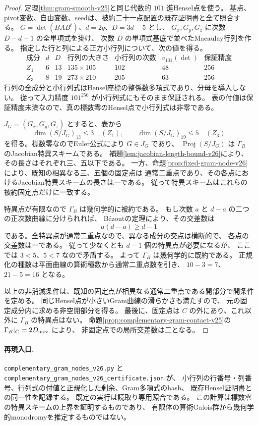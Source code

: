 \begin{proof}
定理\ref{thm:gram-smooth-v25}と同じ代数的 $101$ 進Hensel点を使う。
基点、pivot変数、自由変数、seedは、被約二十一点配置の既存証明書と全て照合する。
$G=\det(BAB^t)$、$d=2q$、$D=3d-5$ とし、
$G_x,G_y,G_z$ に次数 $D-d+1$ の全単項式を掛け、
次数 $D$ の単項式基底で並べたMacaulay行列を作る。
指定した行と列による正方小行列について、次の値を得る。
\[
\begin{array}{c|c|c|c|c|c|c}
 \text{成分}&d&D&\text{行列の大きさ}&
 \text{小行列の次数}&v_{101}(\det)&\text{保証精度}\\\hline
 Z_1&6&13&135\times105&102&48&256\\
 Z_3&8&19&273\times210&205&63&256
\end{array}
\]
行列の全成分と小行列式はHensel座標の整係数多項式であり、分母を導入しない。
従って入力精度 $101^{256}$ が小行列式にもそのまま保証される。
表の付値は保証精度未満なので、真の標数零のHensel点で小行列式は非零である。

$J_G=(G_x,G_y,G_z)$ とすると、表から
\[
 \dim(S/J_G)_{13}\leq3\quad(Z_1),\qquad
 \dim(S/J_G)_{19}\leq5\quad(Z_3)
\]
を得る。標数零なのでEuler公式により $G\in J_G$ であり、
$\operatorname{Proj}(S/J_G)$ は $\Gamma_B$ のJacobian特異スキームである。
補題\ref{lem:jacobian-length-bound-v26}により、その長さはそれぞれ三、五以下である。
一方、命題\ref{prop:fixed-gram-node-v26}により、既知の相異なる三、五個の固定点は
通常二重点であり、その各点におけるJacobian特異スキームの長さは一である。
従って特異スキームはこれらの被約固定点だけに一致する。

特異点が有限なので $\Gamma_B$ は幾何学的に被約である。
もし次数 $a$ と $d-a$ の二つの正次数曲線に分けられれば、
B\'ezoutの定理により、その交差数は
\[
 a(d-a)\geq d-1
\]
である。全特異点が通常二重点なので、異なる成分の交点は横断的で、
各点の交差数は一である。
従って少なくとも $d-1$ 個の特異点が必要になるが、
ここでは $3<5$、$5<7$ なので矛盾する。
よって $\Gamma_B$ は幾何学的に既約である。
正規化の種数は平面曲線の算術種数から通常二重点数を引き、
$10-3=7$、$21-5=16$ となる。

以上の非消滅条件は、既知の固定点が相異なる通常二重点である開部分で開条件を定める。
同じHensel点が小さいGram曲線の滑らかさも満たすので、
元の固定成分内に求める非空開部分を得る。
最後に、固定点は $C$ の外にあり、これ以外に $\Gamma_B$ の特異点はない。
命題\ref{prop:complementary-gram-contact-v25}の
$\Gamma_B|_C=2D_{\rm mov}$ により、
非固定点での局所交差数は二となる。
\end{proof}

\paragraph{再現入口.}
\nolinkurl{complementary_gram_nodes_v26.py} と
\nolinkurl{complementary_gram_nodes_v26_certificate.json} が、
小行列の行番号・列番号、行列式の付値と正規化した剰余、Gram多項式のhash、
既存Hensel証明書との同一性を記録する。
既定の実行は読取り専用照合である。
この計算は標数零の特異スキームの上界を証明するものであり、
有限体の算術Galois群から幾何学的monodromyを推定するものではない。

